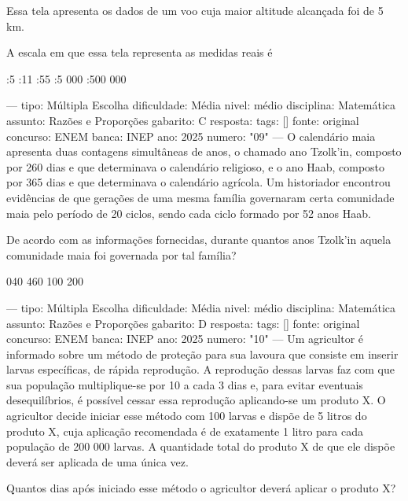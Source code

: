 Essa tela apresenta os dados de um voo cuja maior altitude alcançada foi de 5 km.

A escala em que essa tela representa as medidas reais é
\begin{choices}
:5
:11
:55
:5 000
:500 000
\end{choices}

---
tipo: Múltipla Escolha
dificuldade: Média
nivel: médio
disciplina: Matemática
assunto: Razões e Proporções
gabarito: C
resposta:
tags: []
fonte: original
concurso: ENEM
banca: INEP
ano: 2025
numero: "09"
---
\question
O calendário maia apresenta duas contagens simultâneas de anos, o chamado ano Tzolk'in, composto por 260 dias e que determinava o calendário religioso, e o ano Haab, composto por 365 dias e que determinava o calendário agrícola. Um historiador encontrou evidências de que gerações de uma mesma família governaram certa comunidade maia pelo período de 20 ciclos, sendo cada ciclo formado por 52 anos Haab.


De acordo com as informações fornecidas, durante quantos anos Tzolk'in aquela comunidade maia foi governada por tal família?
\begin{choices}
 040
 460
 100
 200
\end{choices}

---
tipo: Múltipla Escolha
dificuldade: Média
nivel: médio
disciplina: Matemática
assunto: Razões e Proporções
gabarito: D
resposta:
tags: []
fonte: original
concurso: ENEM
banca: INEP
ano: 2025
numero: "10"
---
\question
Um agricultor é informado sobre um método de proteção para sua lavoura que consiste em inserir larvas específicas, de rápida reprodução. A reprodução dessas larvas faz com que sua população multiplique-se por 10 a cada 3 dias e, para evitar eventuais desequilíbrios, é possível cessar essa reprodução aplicando-se um produto X. O agricultor decide iniciar esse método com 100 larvas e dispõe de 5 litros do produto X, cuja aplicação recomendada é de exatamente 1 litro para cada população de 200 000 larvas. A quantidade total do produto X de que ele dispõe deverá ser aplicada de uma única vez.

Quantos dias após iniciado esse método o agricultor deverá aplicar o produto X?
\begin{choices}
\end{choices}

